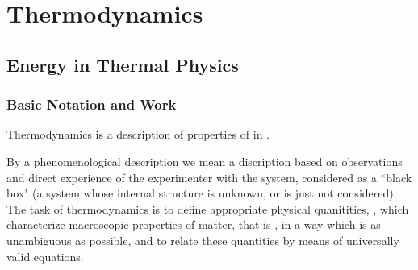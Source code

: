 \documentclass[12pt, a4paper, oneside, openright, titlepage]{book}
\begin{document}
\tableofcontents



\part{Thermodynamics}

\chapter{Energy in Thermal Physics}

\section{Basic Notation and Work}

\begin{defn}
    Thermodynamics is a  description of properties of  in .
\end{defn}

By a phenomenological description we mean a discription based on observations and direct experience of the experimenter with the system, considered as a ``black box" (a system whose internal structure is unknown, or is just not considered). The task of thermodynamics is to define appropriate physical quanitities, , which characterize macroscopic properties of matter, that is , in a way which is as unambiguous as possible, and to relate these quantities by means of universally valid equations.
\end{document}
